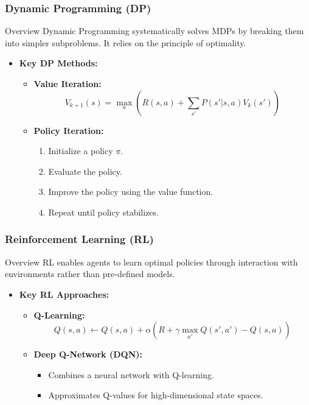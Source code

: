 \documentclass[aspectratio=169]{beamer}
\begin{document}
\begin{frame}[fragile]
    \frametitle{Dynamic Programming (DP)}
    \begin{block}{Overview}
        Dynamic Programming systematically solves MDPs by breaking them into simpler subproblems.
        It relies on the principle of optimality.
    \end{block}
    
    \begin{itemize}
        \item \textbf{Key DP Methods:}
        \begin{itemize}
            \item \textbf{Value Iteration:}
            \begin{equation}
                V_{k+1}(s) = \max_a \left( R(s, a) + \sum_{s'} P(s'|s, a)V_k(s') \right)
            \end{equation}
            \item \textbf{Policy Iteration:}
            \begin{enumerate}
                \item Initialize a policy \( \pi \).
                \item Evaluate the policy.
                \item Improve the policy using the value function.
                \item Repeat until policy stabilizes.
            \end{enumerate}
        \end{itemize}
    \end{itemize}
\end{frame}

\begin{frame}[fragile]
    \frametitle{Reinforcement Learning (RL)}
    \begin{block}{Overview}
        RL enables agents to learn optimal policies through interaction with environments rather than pre-defined models.
    \end{block}
    
    \begin{itemize}
        \item \textbf{Key RL Approaches:}
        \begin{itemize}
            \item \textbf{Q-Learning:}
            \begin{equation}
                Q(s, a) \leftarrow Q(s, a) + \alpha \left( R + \gamma \max_{a'} Q(s', a') - Q(s, a) \right)
            \end{equation}
            \item \textbf{Deep Q-Network (DQN):}
            \begin{itemize}
                \item Combines a neural network with Q-learning.
                \item Approximates Q-values for high-dimensional state spaces.
            \end{itemize}
        \end{itemize}
    \end{itemize}
\end{frame}
\end{document}
